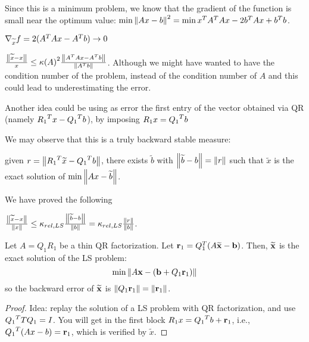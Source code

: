 \documentclass[ComputationalMathematics.tex]{subfiles}
\begin{document}
  Since this is a minimum problem, we know that the gradient of the function is small near the optimum value: $\min {\left\lVert Ax - b\right\rVert}^2 = \min {x}^{T} {A}^{T} A x  - 2 {b}^{T} A x + {b}^{T} b$.

  $\nabla_{\widetilde{x}} f = 2 ({A}^{T} A x - {A}^{T} b) \to 0$

  \begin{theorem}
    $\frac{\left\lVert\widetilde{x} - x\right\rVert}{x} \le {\kappa(A)}^2 \frac{\left\lVert{A}^{T} A x - {A}^{T} b\right\rVert}{\left\lVert{A}^{T} b\right\rVert}$. Although we might have wanted to have the condition number of the problem, instead of the condition number of $A$ and this could lead to underestimating the error.
  \end{theorem}

Another idea could be using as error the first entry of the vector obtained via QR (namely ${R_1}^{T} x - {Q_1}^{T} b$), by imposing $R_1 x = {Q_1}^{T} b$

We may observe that this is a truly backward stable measure:

given $r = \left\lVert{R_1}^{T} \widetilde{x} - {Q_1}^{T} b\right\rVert$, there exists $\widetilde{b}$ with $\left\lVert\widetilde{b} - b\right\rVert = \left\lVert r\right\rVert$ such that $\widetilde{x}$ is the exact solution of $\min \left\lVert Ax - \widetilde{b}\right\rVert$.

We have proved the following

\begin{proposition}
  $\frac{\left\lVert\widetilde{x} - x\right\rVert}{\left\lVert x\right\rVert} \le \kappa_{rel, LS} \frac{\left\lVert\widetilde{b} - b\right\rVert}{\left\lVert b\right\rVert} = \kappa_{rel, LS} \frac{\left\lVert r\right\rVert}{\left\lVert b\right\rVert}$.
\end{proposition}


\begin{theorem}
  Let $A=Q_1R_1$ be a thin QR factorization. Let $\mathbf{r}_1 = Q_1^T(A\widetilde{\mathbf{x}}-\mathbf{b})$. Then, $\widetilde{\mathbf{x}}$ is the exact solution of the LS problem:
\[
\min \left\lVert A\mathbf{x} - (\mathbf{b}+Q_1\mathbf{r}_1)\right\rVert
\]
so the backward error of $\widetilde{\mathbf{x}}$ is $\left\lVert Q_1\mathbf{r}_1\right\rVert = \left\lVert\mathbf{r}_1\right\rVert$.
\end{theorem}

\begin{proof}
  Idea: replay the solution of a LS problem with QR factorization, and use ${Q_1}^{T}TQ_1=I$. You will get in the first block $R_1 x = {Q_1}^{T} b + \mathbf{r}_1$, i.e., ${Q_1}^{T}(Ax-b)=\mathbf{r}_1$, which is verified by $\widetilde{x}$.
\end{proof}
\end{document}

